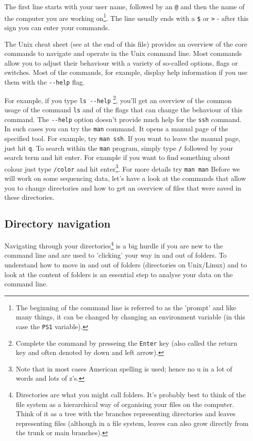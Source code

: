 \documentclass[11pt]{article}
\begin{document}
The first line starts with your user name, followed by an \texttt{@} and then
the name of the computer you are working on\footnote{The beginning of the command line is referred to as the 'prompt' and
like many things, it can be changed by 
changing an environment variable (in this case the \texttt{PS1} variable).}. 
The line usually ends with a
\texttt{\$} or \texttt{>} - after this sign you can enter your commands.

The Unix cheat sheet (see at the end of this file) provides an
overview of the core commands to navigate and operate in the Unix
command line. Most commands allow you to adjust their behaviour with a
variety of so-called options, flags or switches. Most of the commands, for
example, display help information if you use them with the \texttt{-{}-help}
flag.

For example, if you type \texttt{ls -{}-help} \footnote{Complete the command by presseing the \texttt{Enter} key (also called the 
return key and often denoted by down and left arrow).}, you'll get an overview of the
common usage of the command \texttt{ls} and of the flags that can change the
behaviour of this command.  The \texttt{-{}-help} option doesn't provide much
help for the \texttt{ssh} command. In such cases you can try the \texttt{man}
command. It opens a manual page of the specified tool. For example,
try \texttt{man ssh}. If you want to leave the manual page, just hit \texttt{q}.
To search within the \texttt{man} program, simply type \texttt{/} followed by your search
term and hit enter. For example if you want to find something about colour
just type \texttt{/color} and hit enter\footnote{Note that in most cases American spelling is used; hence no u in a lot
of words and lots of z's.}. For more details try \texttt{man man}
Before we will work on some sequencing data, let's have a look
at the commands that allow you to change directories and how to get an
overview of files that were saved in these directories.

\subsection{Directory navigation}
\label{sec:orgheadline10}
Navigating through your directories\footnote{Directories are what you might call folders. It's probably best to
think of the file system as a hierarchical way of organising your files on the
computer. Think of it as a tree with the branches representing directories
and leaves representing files (although in a file system, leaves can also
grow directly from the trunk or main branches).} is a big hurdle if you are new to
the command line and are used to 'clicking' your way in and out of folders. To
understand how to move in and out of folders (directories on Unix/Linux) and to look at the
content of folders is an essential step to analyse your data on
the command line.
\end{document}

